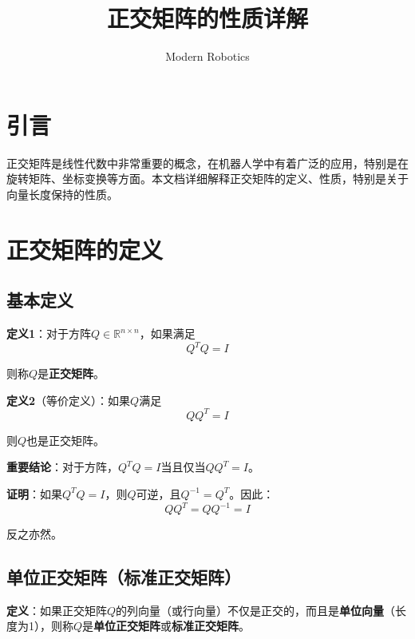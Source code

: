 \documentclass[12pt,a4paper]{article}
\title{正交矩阵的性质详解}
\author{Modern Robotics}
\date{}
\begin{document}
\maketitle

\tableofcontents
\newpage

\section{引言}

正交矩阵是线性代数中非常重要的概念，在机器人学中有着广泛的应用，特别是在旋转矩阵、坐标变换等方面。本文档详细解释正交矩阵的定义、性质，特别是关于向量长度保持的性质。

\section{正交矩阵的定义}

\subsection{基本定义}

\textbf{定义1}：对于方阵$Q \in \mathbb{R}^{n \times n}$，如果满足
\begin{equation}
Q^T Q = I
\label{eq:orthogonal_def1}
\end{equation}

则称$Q$是\textbf{正交矩阵}。

\textbf{定义2}（等价定义）：如果$Q$满足
\begin{equation}
Q Q^T = I
\label{eq:orthogonal_def2}
\end{equation}

则$Q$也是正交矩阵。

\textbf{重要结论}：对于方阵，$Q^T Q = I$当且仅当$Q Q^T = I$。

\textbf{证明}：如果$Q^T Q = I$，则$Q$可逆，且$Q^{-1} = Q^T$。因此：
\begin{equation}
Q Q^T = Q Q^{-1} = I
\end{equation}

反之亦然。

\subsection{单位正交矩阵（标准正交矩阵）}

\textbf{定义}：如果正交矩阵$Q$的列向量（或行向量）不仅是正交的，而且是\textbf{单位向量}（长度为1），则称$Q$是\textbf{单位正交矩阵}或\textbf{标准正交矩阵}。
\end{document}
